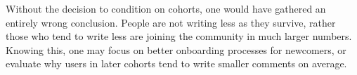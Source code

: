 Without the decision to condition on cohorts, one would have gathered an entirely wrong conclusion. People are not writing less as they survive, rather those who tend to write less are joining the community in much larger numbers. Knowing this, one may focus on better onboarding processes for newcomers, or evaluate why users in later cohorts tend to write smaller comments on average. 



